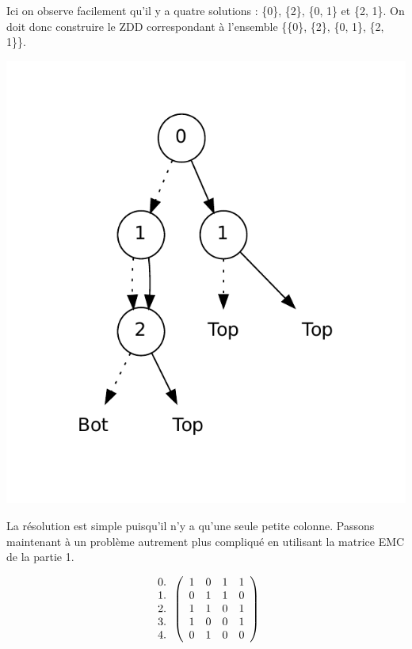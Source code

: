 \documentclass[a4paper]{article}
\begin{document}
Ici on observe facilement qu'il y a quatre solutions  : \{0\}, \{2\},
\{0, 1\} et  \{2, 1\}.
On doit donc construire le ZDD correspondant à l'ensemble \{\{0\}, \{2\}, 
\{0, 1\}, \{2, 1\}\}. 

\begin{center}
\includegraphics[scale=0.6]{../imports/zdd_sol_1x3.pdf}
\end{center}


La résolution est simple puisqu'il n'y a qu'une seule petite colonne. 
Passons maintenant à un problème autrement plus compliqué en utilisant la 
matrice EMC de la partie 1. 


\[
  \begin{array}{ c }
   0. \\
   1. \\
   2. \\
   3. \\
   4. \\
  \end{array}
\left(
  \begin{array}{ c c c c c }
   1 & 0 & 1 & 1 \\
   0 & 1 & 1 & 0 \\
   1 & 1 & 0 & 1 \\
   1 & 0 & 0 & 1 \\
   0 & 1 & 0 & 0
  \end{array} \right)
\]
\end{document}
